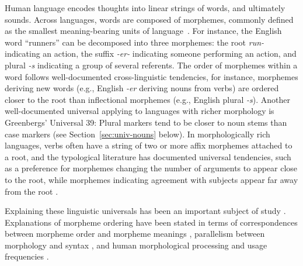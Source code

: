 \documentclass[11pt,letterpaper]{article}
\newcommand{\citep}{\parencite}
\newcounter{def}
\begin{document}
Human language encodes thoughts into linear strings of words, and ultimately sounds.
Across languages, words are composed of morphemes, commonly defined as the smallest meaning-bearing units of language~\citep{courtenay1895attempt,bloomfield1926a,katamba2006morphology}.
For instance, the English word ``runners'' can be decomposed into three morphemes: the root \textit{run-} indicating an action, the suffix \textit{-er-} indicating someone performing an action, and plural \textit{-s} indicating a group of several referents.
The order of morphemes within a word follows well-documented cross-linguistic tendencies, for instance, morphemes deriving new words (e.g., English \textit{-er} deriving nouns from verbs) are ordered closer to the root than inflectional morphemes (e.g., English plural \textit{-s}).
Another well-documented universal applying to languages with richer morphology is Greenbergs' Universal 39:
Plural markers tend to be closer to noun stems than case markers \citep[112]{greenberg1963universals} (see Section~\ref{sec:univ-nouns} below).
In morphologically rich languages, verbs often have a string of two or more affix morphemes attached to a root, and the typological literature has documented universal tendencies, such as a preference for morphemes changing the number of arguments to appear close to the root, while morphemes indicating agreement with subjects appear far away from the root \citep{bybee-morphology-1985}.

Explaining these linguistic universals has been an important subject of study \citep{bybee-morphology-1985, spencer2006linguistic, manova2010modeling, bauer2010an, rice2011principles}.
Explanations of morpheme ordering have been stated in terms of correspondences between morpheme order and morpheme meanings \citep{bybee-morphology-1985,rice2000morpheme}, parallelism between morphology and syntax \citep{givon1971historical,venneman1973explanation,baker1985the}, and human morphological processing and usage frequencies \citep{hay2002speech, plag2002the, inkelas2016affix}.
\end{document}
